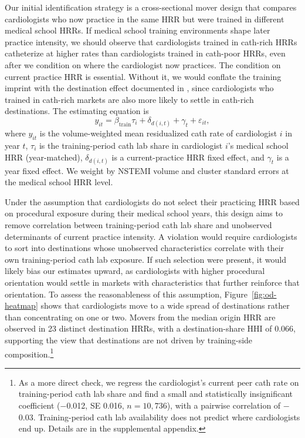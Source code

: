\documentclass[12pt]{article}
\let\textcite\citet
\begin{document}
Our initial identification strategy is a cross-sectional mover design that compares cardiologists who now practice in the same HRR but were trained in different medical school HRRs. If medical school training environments shape later practice intensity, we should observe that cardiologists trained in cath-rich HRRs catheterize at higher rates than cardiologists trained in cath-poor HRRs, even after we condition on where the cardiologist now practices. The condition on current practice HRR is essential. Without it, we would conflate the training imprint with the destination effect documented in \textcite{molitor2018}, since cardiologists who trained in cath-rich markets are also more likely to settle in cath-rich destinations. The estimating equation is
\begin{equation}\label{eq:cs}
y_{it} = \beta_{\text{train}} \tau_{i} + \delta_{d(i,t)} + \gamma_{t} + \varepsilon_{it},
\end{equation}
where $y_{it}$ is the volume-weighted mean residualized cath rate of cardiologist $i$ in year $t$, $\tau_{i}$ is the training-period cath lab share in cardiologist $i$'s medical school HRR (year-matched), $\delta_{d(i,t)}$ is a current-practice HRR fixed effect, and $\gamma_t$ is a year fixed effect. We weight by NSTEMI volume and cluster standard errors at the medical school HRR level. 

Under the assumption that cardiologists do not select their practicing HRR based on procedural exposure during their medical school years, this design aims to remove correlation between training-period cath lab share and unobserved determinants of current practice intensity. A violation would require cardiologists to sort into destinations whose unobserved characteristics correlate with their own training-period cath lab exposure. If such selection were present, it would likely bias our estimates upward, as cardiologists with higher procedural orientation would settle in markets with characteristics that further reinforce that orientation. To assess the reasonableness of this assumption, Figure~\ref{fig:od-heatmap} shows that cardiologists move to a wide spread of destinations rather than concentrating on one or two. Movers from the median origin HRR are observed in 23 distinct destination HRRs, with a destination-share HHI of 0.066, supporting the view that destinations are not driven by training-side composition.\footnote{As a more direct check, we regress the cardiologist's current peer cath rate on training-period cath lab share and find a small and statistically insignificant coefficient ($-$0.012, SE 0.016, $n = 10{,}736$), with a pairwise correlation of $-$0.03. Training-period cath lab availability does not predict where cardiologists end up. Details are in the supplemental appendix.}
\end{document}
